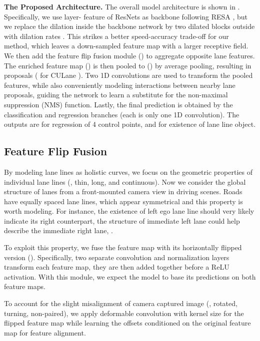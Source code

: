 \documentclass[10pt,twocolumn,letterpaper]{article}
\begin{document}
\noindent \textbf{The Proposed Architecture.} The overall model architecture is shown in . Specifically, we use layer- feature of ResNets \cite{he2016deep} as backbone following RESA \cite{zheng2021resa}, but we replace the dilation inside the backbone network by two dilated blocks outside with dilation rates  \cite{chen2021you}. This strikes a better speed-accuracy trade-off for our method, which leaves a  down-sampled feature map with a larger receptive field. We then add the feature flip fusion module () to aggregate opposite lane features.
The enriched feature map () is then pooled to () by average pooling, resulting in  proposals ( for CULane \cite{pan2018spatial}). 
Two  1D convolutions are used to transform the pooled features, while also conveniently modeling interactions between nearby lane proposals, guiding the network to learn a substitute for the non-maximal suppression (NMS) function. 
Lastly, the final prediction is obtained by the classification and regression branches (each is only one  1D convolution). The outputs are  for regression of 4 control points, and  for existence of lane line object.



\subsection{Feature Flip Fusion}
\label{sec:feature}


By modeling lane lines as holistic curves, we focus on the geometric properties of individual lane lines (\eg, thin, long, and continuous). Now we consider the global structure of lanes from a front-mounted camera view in driving scenes.
Roads have equally spaced lane lines, which appear symmetrical and this property is worth modeling.
For instance, the existence of left ego lane line should very likely indicate its right counterpart, the structure of immediate left lane could help describe the immediate right lane, \etc.

To exploit this property, we fuse the feature map with its horizontally flipped version (). Specifically, two separate convolution and normalization layers transform each feature map, they are then added together before a ReLU activation. With this module, we expect the model to base its predictions on both feature maps.

To account for the slight misalignment of camera captured image (\eg, rotated, turning, non-paired), we apply deformable convolution \cite{zhu2019deformable} with kernel size  for the flipped feature map while learning the offsets conditioned on the original feature map for feature alignment. 
\end{document}
